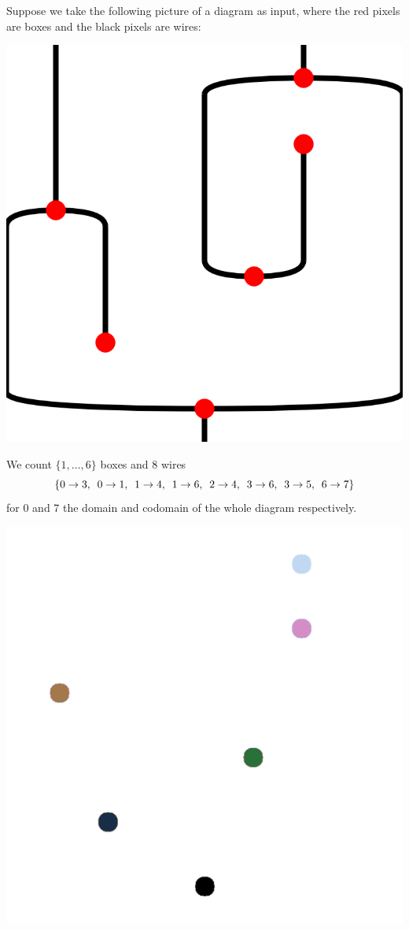 \begin{example}
Suppose we take the following picture of a diagram as input, where the red pixels are boxes and the black pixels are wires:
\begin{center}
\includegraphics[scale=.2]{img/bitmap2diagram/start.png}
\end{center}
We count $\{ 1, \dots, 6 \}$ boxes and 8 wires
$$
\{ 0 \to 3, \enspace
0 \to 1, \enspace
1 \to 4, \enspace
1 \to 6, \enspace
2 \to 4, \enspace
3 \to 6, \enspace
3 \to 5, \enspace
6 \to 7 \}
$$
for $0$ and $7$ the domain and codomain of the whole diagram respectively.
\begin{center}
\includegraphics[scale=.2]{img/bitmap2diagram/boxes.png}

\end{center}
\end{example}
